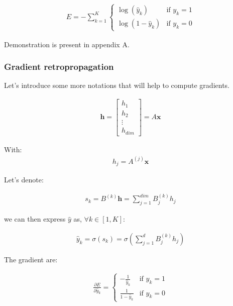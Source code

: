 \begin{align}
	E = - \sum_{k=1}^K
  			  	\left\{
				    \begin{array}{ll}
				        \log (\hat y_k) & \mbox{if } y_k =1 \\
				        \log (1 - \hat y_k) & \mbox{if } y_k =0
				    \end{array}
				\right.
\end{align}

Demonstration is present in appendix A.


\subsubsection{Gradient retropropagation}

Let's introduce some more notations that will help to compute gradients.

\begin{align}
	\mathbf{h}
	= \begin{bmatrix} 
		h_1 \\
		h_2 \\
		\vdots \\
		h_{\textit{dim}}
	\end{bmatrix}
	= A\mathbf{x}
\end{align}

With:
\begin{align}
	h_j = A^{(j)}\mathbf{x}
\end{align}


Let's denote:

\begin{align}
	s_k  = B^{(k)} \mathbf{h} = \sum_{j=1}^{\textit{dim}} B^{(k)}_j h_j 
\end{align}

we can then express $\hat y$ as, $\forall k \in [1, K]$:

\begin{align}
	\hat y_k  = \sigma(s_k) = \sigma( \sum_{j=1}^{d} B^{(k)}_j h_j) 
\end{align}


The gradient are:

\begin{align}
	\frac{ \partial E } { \partial \hat y_k } = 
		\left\{
		    \begin{array}{ll}
		        - \frac{1}{\hat y_k} & \mbox{if } y_k =1 \\
		        \frac{1}{1 - \hat y_k} & \mbox{if } y_k =0
		    \end{array}
		\right.
\end{align}


